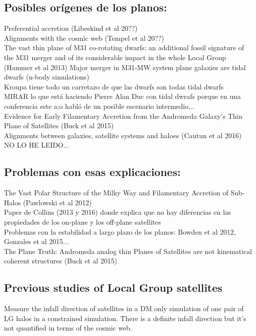\documentclass{emulateapj}
\begin{document}
\subsection{Posibles or\'igenes de los planos:}
\noindent Preferential accretion (Libeskind et al 20??)\\
Alignments with the cosmic web (Tempel et al 20??)\\
The vast thin plane of M31 co-rotating dwarfs: an additional fossil
signature of the M31 merger and of its considerable impact in the
whole Local Group (Hammer et al 2013) Major merger in M31-MW system
plane galaxies are tidal dwarfs (n-body simulations)\\
Kroupa tiene todo un carretazo de que las dwarfs son todas tidal
dwarfs\\
MIRAR lo que est\'a haciendo Pierre Alan Duc con tidal dwrafs porque en
una conferencia este a;o habl\'o de un posible escenario
intermedio...\\
Evidence for Early Filamentary Accretion from the Andromeda Galaxy's
Thin Plane of Satellites (Buck et al 2015)\\
Alignments between galaxies, satellite systems and haloes (Cautun et al
2016) NO LO HE LEIDO...

\subsection{Problemas con esas explicaciones:}
The Vast Polar Structure of the Milky Way and Filamentary Accretion of
Sub-Halos (Pawlowski et al 2012)\\
Paper de Collins (2013 y 2016) donde explica que no hay diferencias en
las propiedades de los on-plane y los off-plane satellites\\
Problemas con la estabilidad a largo plazo de los planos: Bowden et al
2012, Gonzales et al 2015...\\
The Plane Truth: Andromeda analog thin Planes of Satellites are not
kinematical coherent structures (Buck et al 2015)\\

 
\subsection{Previous studies of Local Group satellites}

\citep{2011MNRAS.411.1525L} Measure the infall direction of satellites
in a DM only simulation of one pair of LG halos in a constrained
simulation. There is a definite infall direction but it's not
quantified in terms of the cosmic web.
 
\end{document}
